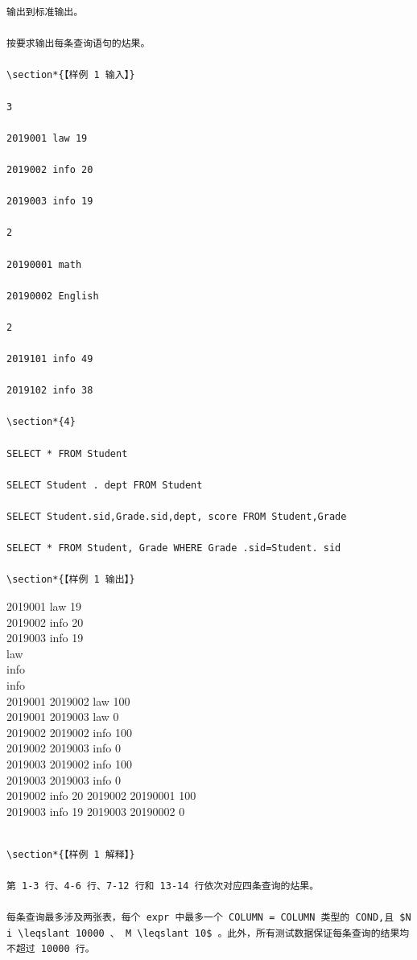 \documentclass[10pt]{article}
\begin{document}
\begin{verbatim}
输出到标准输出。

按要求输出每条查询语句的炶果。

\section*{【样例 1 输入】}

3

2019001 law 19

2019002 info 20

2019003 info 19

2

20190001 math

20190002 English

2

2019101 info 49

2019102 info 38

\section*{4}

SELECT * FROM Student

SELECT Student . dept FROM Student

SELECT Student.sid,Grade.sid,dept, score FROM Student,Grade

SELECT * FROM Student, Grade WHERE Grade .sid=Student. sid

\section*{【样例 1 输出】}

\end{verbatim}

2019001 law 19\\
2019002 info 20\\
2019003 info 19\\
law\\
info\\
info\\
2019001 2019002 law 100\\
2019001 2019003 law 0\\
2019002 2019002 info 100\\
2019002 2019003 info 0\\
2019003 2019002 info 100\\
2019003 2019003 info 0\\
2019002 info 20 2019002 20190001 100\\
2019003 info 19 2019003 20190002 0

\begin{verbatim}

\section*{【样例 1 解释】}

第 1-3 行、4-6 行、7-12 行和 13-14 行依次对应四条查询的炶果。

每条查询最多涉及两张表，每个 expr 中最多一个 COLUMN = COLUMN 类型的 COND,且 $N i \leqslant 10000 、 M \leqslant 10$ 。此外，所有测试数据保证每条查询的结果均不超过 10000 行。
\end{verbatim}
\end{document}
